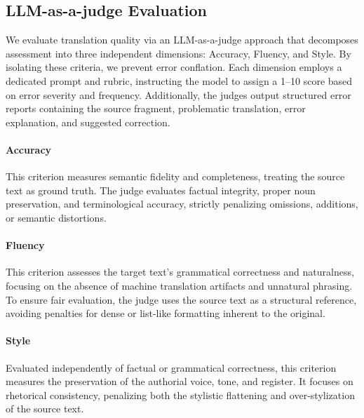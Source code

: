 \documentclass[11pt]{article}
\newcommand{\moduleEvaluation}{LLM-as-a-judge Evaluation}
\begin{document}

\subsection{\moduleEvaluation}\label{sec:llm_metrics}
We evaluate translation quality via an LLM-as-a-judge approach that decomposes assessment into three independent dimensions: Accuracy, Fluency, and Style. By isolating these criteria, we prevent error conflation. Each dimension employs a dedicated prompt and rubric, instructing the model to assign a 1--10 score based on error severity and frequency. Additionally, the judges output structured error reports containing the source fragment, problematic translation, error explanation, and suggested correction.

\paragraph{Accuracy} This criterion measures semantic fidelity and completeness, treating the source text as ground truth. The judge evaluates factual integrity, proper noun preservation, and terminological accuracy, strictly penalizing omissions, additions, or semantic distortions.

\paragraph{Fluency} This criterion assesses the target text's grammatical correctness and naturalness, focusing on the absence of machine translation artifacts and unnatural phrasing. To ensure fair evaluation, the judge uses the source text as a structural reference, avoiding penalties for dense or list-like formatting inherent to the original.

\paragraph{Style} Evaluated independently of factual or grammatical correctness, this criterion measures the preservation of the authorial voice, tone, and register. It focuses on rhetorical consistency, penalizing both the stylistic flattening and over-stylization of the source text.
\end{document}
